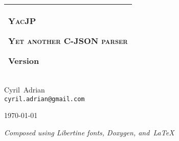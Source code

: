 \documentclass[a4paper,twoside,10pt]{book}
\begin{document}
\hypersetup{pageanchor=false,citecolor=blue}
\begin{titlepage}
  \vspace*{3cm}
  \begin{center}
    \begin{tabular}{p{10cm}}
      \hline
      \begin{minipage}[t]{10cm}
        \begin{center}
          \vspace*{2ex}
          {\Huge\textsc{YacJP}}

          \vspace*{1ex}
          {\Large\textsc{Yet another C-JSON parser}}

          \vspace*{1ex}
          Version 
        \end{center}
      \end{minipage}
      \vspace{1ex}\\
      \hline
    \end{tabular}

    \vspace*{8em}
    {Cyril~{\sc Adrian} \\ \texttt{cyril.adrian@gmail.com}}

    \vspace*{2cm}
    \today

    \vfill
    \emph{\small Composed using Libertine fonts, Doxygen, and~\LaTeX~} \libertinelogo
  \end{center}
\end{titlepage}
\clearemptydoublepage
{}
\tableofcontents
\clearemptydoublepage
{}
\hypersetup{pageanchor=true,citecolor=blue}
\end{document}
